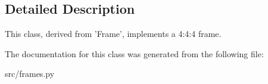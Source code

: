 \subsection{Detailed Description}
\begin{DoxyVerb}This class, derived from 'Frame', implements a 4:4:4 frame.
\end{DoxyVerb}
 

The documentation for this class was generated from the following file\+:\begin{DoxyCompactItemize}
\item 
src/frames.\+py\end{DoxyCompactItemize}
